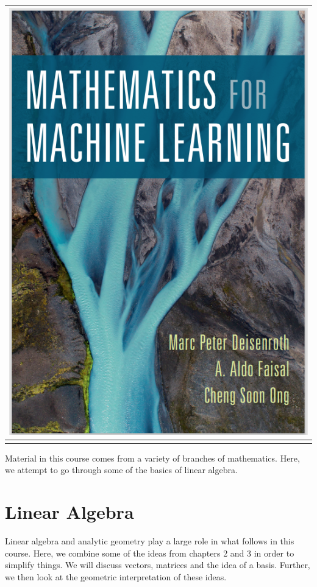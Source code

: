 \documentclass[
]{book}
\theoremstyle{definition}
\theoremstyle{definition}
\theoremstyle{definition}
\theoremstyle{definition}
\theoremstyle{remark}
\begin{document}
\begin{longtable}[]{@{}c@{}}
\toprule\noalign{}
\includegraphics{MML1.png} \\
\midrule\noalign{}
\endhead
\bottomrule\noalign{}
\endlastfoot
\end{longtable}

Material in this course comes from a variety of branches of mathematics. Here, we attempt to go through some of the basics of linear algebra.

\hypertarget{linear-algebra}{%
\chapter{Linear Algebra}\label{linear-algebra}}

Linear algebra and analytic geometry play a large role in what follows in this course. Here, we combine some of the ideas from chapters 2 and 3 in order to simplify things. We will discuss vectors, matrices and the idea of a basis. Further, we then look at the geometric interpretation of these ideas.
\end{document}
